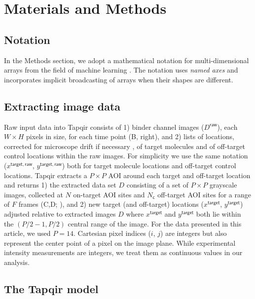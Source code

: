 \section{Materials and Methods}

\subsection{Notation} 

In the Methods section, we adopt a mathematical notation for multi-dimensional arrays from the field of machine learning  \citep{Chiang2021-fi}.  The notation uses \textit{named axes} and incorporates implicit broadcasting of arrays when their shapes are different.

\subsection{Extracting image data} 

Raw input data into Tapqir consists of 1) binder channel images ($D^\mathsf{raw}$), each $W \times H$ pixels in size, for each time point (B, right), and 2)  lists of locations, corrected for microscope drift if necessary \citep{Friedman2015-nx}, of target molecules and of off-target control locations  \citep{Friedman2015-nx} within the raw images. For simplicity we use the same notation ($x^{\mathsf{target}, \mathsf{raw}}$, $y^{\mathsf{target}, \mathsf{raw}}$) both for target molecule locations and off-target control locations. Tapqir extracts a $P \times P$ AOI around each target and off-target location and returns 1) the extracted data set $D$ consisting of a set of $P \times P$ grayscale images, collected at $N$ on-target AOI sites and $N_\mathsf{c}$  off-target AOI sites for a range of $F$ frames (C,D; ), and 2) new target (and off-target) locations ($x^\mathsf{target}$, $y^\mathsf{target}$) adjusted relative to extracted images $D$ where $x^\mathsf{target}$ and $y^\mathsf{target}$ both lie within the $(P/2-1,P/2)$ central range of the image. For the data presented in this article, we used $P = 14$. Cartesian pixel indices ($i$, $j$) are integers but also represent the center point of a pixel on the image plane. While experimental intensity measurements are integers, we treat them as continuous values in our analysis.



\subsection{The Tapqir model} 

